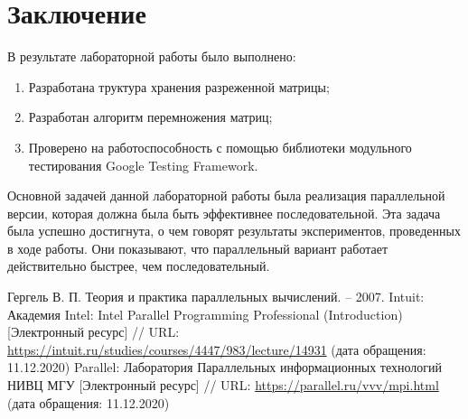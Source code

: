 \documentclass{report}
\begin{document}
\newpage
\section*{Заключение}
\par В результате лабораторной работы было выполнено:
\begin{enumerate}
\item Разработана труктура хранения разреженной матрицы;
\item Разработан алгоритм перемножения матриц;
\item Проверено на работоспособность с помощью библиотеки модульного тестирования Google Testing Framework.
\end{enumerate}
\par Основной задачей данной лабораторной работы была реализация параллельной версии, которая должна была быть эффективнее последовательной. Эта задача была успешно достигнута, о чем говорят результаты экспериментов, проведенных в ходе работы. Они показывают, что параллельный вариант работает действительно быстрее, чем последовательный.
\newpage

\begin{thebibliography}{1}
 Гергель В. П. Теория и практика параллельных вычислений. – 2007. 
 Intuit: Академия Intel: Intel Parallel Programming Professional (Introduction) [Электронный ресурс] // URL: \url { https://intuit.ru/studies/courses/4447/983/lecture/14931} (дата обращения: 11.12.2020)
 Parallel: Лаборатория Параллельных информационных технологий НИВЦ МГУ [Электронный ресурс] // URL: \url {https://parallel.ru/vvv/mpi.html} (дата обращения: 11.12.2020)

\end{thebibliography}

\newpage
\end{document}
